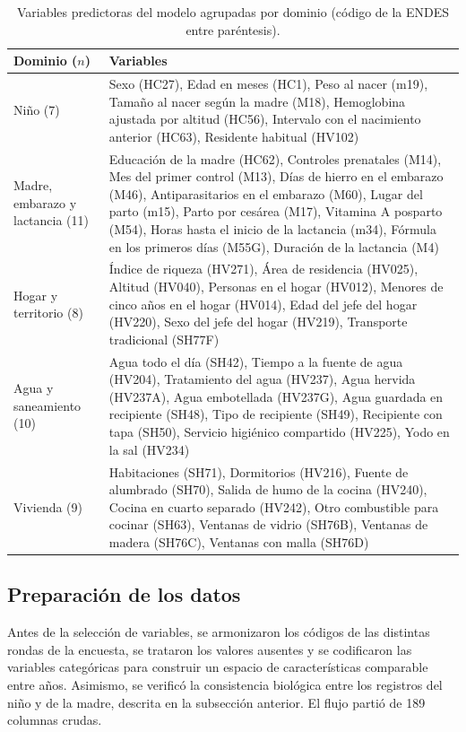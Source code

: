 \documentclass[final,5p,times,twocolumn,authoryear,lefttitle]{elsarticle}
\begin{document}
\begin{table}[!tp]
\centering
\caption{Variables predictoras del modelo agrupadas por dominio (código de la ENDES entre paréntesis).}
\label{tab:variables}
\small
\begin{tabular}{p{}p{}}
\hline
Dominio ($n$) & Variables \\
\hline
Niño (7) & Sexo (HC27), Edad en meses (HC1), Peso al nacer (m19), Tamaño al nacer según la madre (M18), Hemoglobina ajustada por altitud (HC56), Intervalo con el nacimiento anterior (HC63), Residente habitual (HV102) \\
Madre, embarazo y lactancia (11) & Educación de la madre (HC62), Controles prenatales (M14), Mes del primer control (M13), Días de hierro en el embarazo (M46), Antiparasitarios en el embarazo (M60), Lugar del parto (m15), Parto por cesárea (M17), Vitamina A posparto (M54), Horas hasta el inicio de la lactancia (m34), Fórmula en los primeros días (M55G), Duración de la lactancia (M4) \\
Hogar y territorio (8) & Índice de riqueza (HV271), Área de residencia (HV025), Altitud (HV040), Personas en el hogar (HV012), Menores de cinco años en el hogar (HV014), Edad del jefe del hogar (HV220), Sexo del jefe del hogar (HV219), Transporte tradicional (SH77F) \\
Agua y saneamiento (10) & Agua todo el día (SH42), Tiempo a la fuente de agua (HV204), Tratamiento del agua (HV237), Agua hervida (HV237A), Agua embotellada (HV237G), Agua guardada en recipiente (SH48), Tipo de recipiente (SH49), Recipiente con tapa (SH50), Servicio higiénico compartido (HV225), Yodo en la sal (HV234) \\
Vivienda (9) & Habitaciones (SH71), Dormitorios (HV216), Fuente de alumbrado (SH70), Salida de humo de la cocina (HV240), Cocina en cuarto separado (HV242), Otro combustible para cocinar (SH63), Ventanas de vidrio (SH76B), Ventanas de madera (SH76C), Ventanas con malla (SH76D) \\
\hline
\end{tabular}
\end{table}

\subsection{Preparación de los datos}

Antes de la selección de variables, se armonizaron los códigos de las distintas rondas de la encuesta, se trataron los valores ausentes y se codificaron las variables categóricas para construir un espacio de características comparable entre años. Asimismo, se verificó la consistencia biológica entre los registros del niño y de la madre, descrita en la subsección anterior. El flujo partió de 189 columnas crudas.
\end{document}
